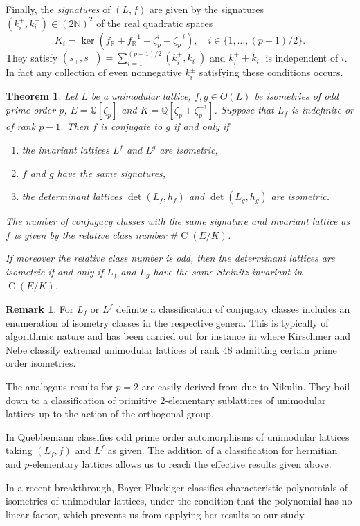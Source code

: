 \documentclass{amsart}
\theoremstyle{definition}
\newtheorem{remark}[definition]{Remark}
\theoremstyle{plain}
\newtheorem{theorem}[definition]{Theorem}
\DeclareMathOperator{\Cl}{C}
\newcommand{\QQ}{\mathbb{Q}}
\newcommand{\RR}{\mathbb{R}}
\newcommand{\NN}{\mathbb{N}}
\begin{document}
Finally, the \emph{signatures} of $(L,f)$ are given by the signatures $(k_i^+,k_i^-)\in (2\NN)^2$ of the real quadratic spaces
\begin{equation}\label{eqn:sign}
K_i=\ker(f_\RR+f_\RR^{-1}- \zeta_p^i - \zeta_p^{-i}), \quad i \in \{1,\dots, (p-1)/2\}.\end{equation}
They satisfy $(s_+,s_-)=\sum_{i=1}^{(p-1)/2}(k_i^+,k_i^-)$ and $k_i^+ + k_i^-$ is independent of $i$. In fact any collection of even nonnegative $k_i^\pm$ satisfying these conditions occurs.
\begin{theorem}\label{thm:unimodular_conjugacy}
Let $L$ be a unimodular lattice, $f,g \in O(L)$ be isometries of odd prime order $p$,
$E=\QQ[\zeta_p]$ and $K= \QQ[\zeta_p + \zeta_p^{-1}]$.
Suppose that $L_f$ is indefinite or of rank $p-1$.
Then $f$ is conjugate to $g$ if and only if
\begin{enumerate}
 \item the invariant lattices $L^f$ and $L^g$ are isometric,
 \item $f$ and $g$ have the same signatures,
 \item the determinant lattices $\det(L_f,h_f)$ and $\det(L_g,h_g)$ are isometric.
\end{enumerate}
The number of conjugacy classes with the same signature and invariant lattice as $f$ is given by the relative class number $\# \Cl(E/K)$.

If moreover the relative class number is odd, then the determinant lattices are isometric if and only if $L_f$ and $L_g$ have the same Steinitz invariant in $\Cl(E/K)$.
\end{theorem}

\begin{remark}
For $L_f$ or $L^f$ definite a classification of conjugacy classes includes an enumeration of isometry classes in the respective genera. This is typically of algorithmic nature and has been carried out for instance in \cite{nebe:automorphisms-unimodular,nebe-kirschmer:binary-hermitian} where Kirschmer and Nebe classify extremal unimodular lattices of rank $48$ admitting certain prime order isometries.

The analogous results for $p=2$ are easily derived from \cite[Thms.\ 3.6.2, 3.6.3, \S 16]{nikulin} due to Nikulin. They boil down to a classification of primitive $2$-elementary sublattices of unimodular lattices up to the action of the orthogonal group.

In \cite{quebbemann} Quebbemann classifies odd prime order automorphisms of unimodular lattices taking $(L_f,f)$ and $L^f$ as given. The addition of a classification for hermitian and $p$-elementary lattices allows us to reach the effective results given above.

In a recent breakthrough, Bayer-Fluckiger \cite{bayer-fluckiger:unimodular-charpoly} classifies characteristic polynomials of isometries of unimodular lattices, under the condition that the polynomial has no linear factor, which prevents us from applying her results to our study.
\end{remark}
\end{document}
